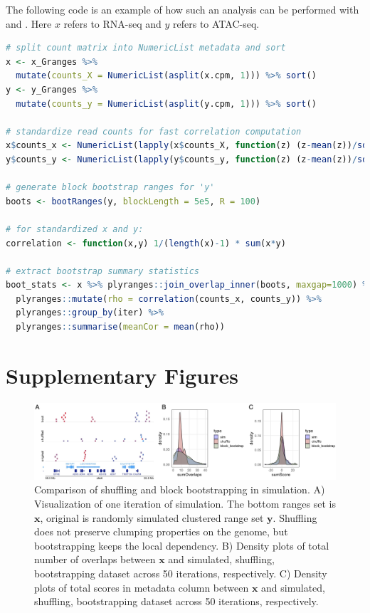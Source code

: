 \documentclass{article}
\begin{document}
The following code is an example of how such an analysis can be
performed with \bootranges and \plyranges. Here $x$ refers to RNA-seq and $y$ refers to ATAC-seq.

\begin{lstlisting}[language=R]
# split count matrix into NumericList metadata and sort
x <- x_Granges %>%
  mutate(counts_X = NumericList(asplit(x.cpm, 1))) %>% sort()
y <- y_Granges %>%
  mutate(counts_y = NumericList(asplit(y.cpm, 1))) %>% sort()

# standardize read counts for fast correlation computation
x$counts_x <- NumericList(lapply(x$counts_X, function(z) (z-mean(z))/sd(z)))
y$counts_y <- NumericList(lapply(y$counts_y, function(z) (z-mean(z))/sd(z)))

# generate block bootstrap ranges for 'y'
boots <- bootRanges(y, blockLength = 5e5, R = 100)

# for standardized x and y:
correlation <- function(x,y) 1/(length(x)-1) * sum(x*y)

# extract bootstrap summary statistics
boot_stats <- x %>% plyranges::join_overlap_inner(boots, maxgap=1000) %>%
  plyranges::mutate(rho = correlation(counts_x, counts_y)) %>%
  plyranges::group_by(iter) %>%
  plyranges::summarise(meanCor = mean(rho)) 
\end{lstlisting} 
 
\newpage

\section{Supplementary Figures}

\begin{figure}[htbp]
\centering
\includegraphics[scale=0.2]{Figures/simulation.jpg}
\caption{Comparison of shuffling and block bootstrapping in simulation. A) Visualization of one iteration of simulation. The bottom ranges set is $\bm{x}$, original is randomly simulated clustered range set $\bm{y}$. Shuffling does not preserve clumping properties on the genome, but bootstrapping keeps the local dependency. B) Density plots of total number of overlaps between $\bm{x}$ and simulated, shuffling, bootstrapping dataset across 50 iterations, respectively. C) Density plots of total scores in metadata column between $\bm{x}$ and simulated, shuffling, bootstrapping dataset across 50 iterations, respectively.}
\label{fig:simulation}
\end{figure}
\end{document}
